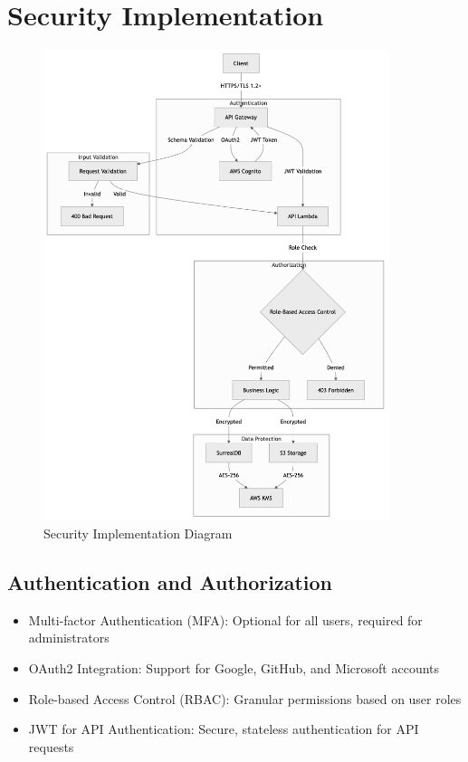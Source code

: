 \documentclass[a4paper, 11pt]{scrreprt}
\begin{document}
\section{Security Implementation}
\begin{figure}[ht]
    \centering
    \includegraphics[width=0.9\textwidth]{security_implementation.png}
    \caption{Security Implementation Diagram}
\end{figure}

\subsection{Authentication and Authorization}
\begin{itemize}
    \item Multi-factor Authentication (MFA): Optional for all users, required for administrators
    \item OAuth2 Integration: Support for Google, GitHub, and Microsoft accounts
    \item Role-based Access Control (RBAC): Granular permissions based on user roles
    \item JWT for API Authentication: Secure, stateless authentication for API requests
\end{itemize}
\end{document}
